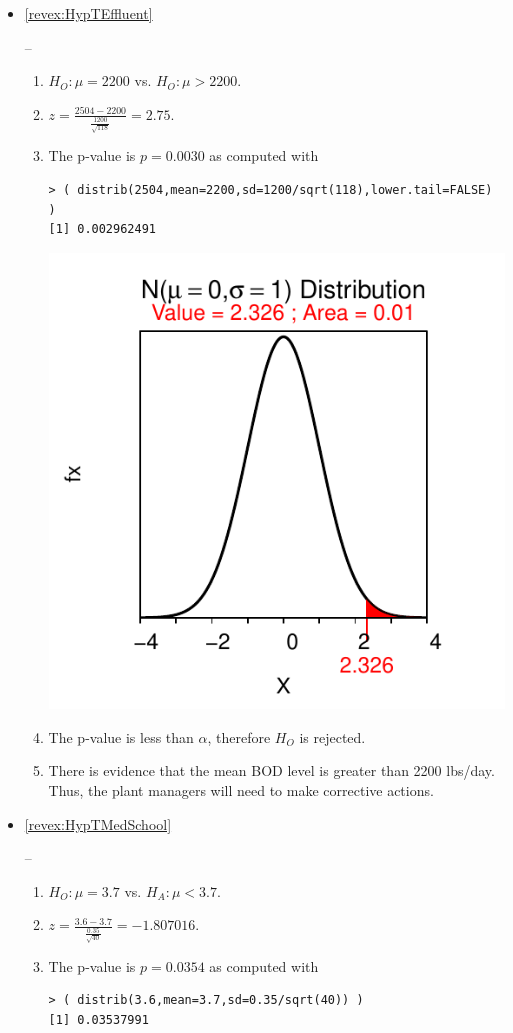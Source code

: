 \documentclass[10pt,openany]{book}\usepackage[]{graphicx}\usepackage[]{color}
\makeatletter
\newenvironment{kframe}{%
 \def\at@end@of@kframe{}%
 \ifinner\ifhmode%
  \def\at@end@of@kframe{\end{minipage}}%
  \begin{minipage}{\columnwidth}%
 \fi\fi%
 \def\FrameCommand##1{\hskip\@totalleftmargin \hskip-\fboxsep
 \colorbox{shadecolor}{##1}\hskip-\fboxsep
     \hskip-\linewidth \hskip-\@totalleftmargin \hskip\columnwidth}%
 \MakeFramed {\advance\hsize-\width
   \@totalleftmargin\z@ \linewidth\hsize
   \@setminipage}}%
 {\par\unskip\endMakeFramed%
 \at@end@of@kframe}
\newenvironment{knitrout}{}{} %
\makeatother
\begin{document}
\begin{itemize}
  \item \hypertarget{ans:HypTEffluent}{\ref{revex:HypTEffluent}} --
    \begin{enumerate}
      \item $H_{O}:\mu=2200$ vs. $H_{O}:\mu>2200$.
      \item $z=\frac{2504-2200}{\frac{1200}{\sqrt{118}}}=2.75$.
      \item The p-value is $p=0.0030$ as computed with
\begin{knitrout}
\color{fgcolor}\begin{kframe}
\begin{verbatim}
> ( distrib(2504,mean=2200,sd=1200/sqrt(118),lower.tail=FALSE) )
[1] 0.002962491
\end{verbatim}
\end{kframe}

{\centering \includegraphics[width=.4\linewidth]{Figs/unnamed-chunk-330-1} 

}



\end{knitrout}
      \item The p-value is less than $\alpha$, therefore $H_{O}$ is rejected.
      \item There is evidence that the mean BOD level is greater than 2200 lbs/day.  Thus, the plant managers will need to make corrective actions.
    \end{enumerate}

  \item \hypertarget{ans:HypTMedSchool}{\ref{revex:HypTMedSchool}} --
    \begin{enumerate}
      \item $H_{O}:\mu=3.7$ vs. $H_{A}:\mu<3.7$.
      \item $z=\frac{3.6-3.7}{\frac{0.35}{\sqrt{40}}}=-1.807016$.
      \item The p-value is $p=0.0354$ as computed with
\begin{knitrout}
\color{fgcolor}\begin{kframe}
\begin{verbatim}
> ( distrib(3.6,mean=3.7,sd=0.35/sqrt(40)) )
[1] 0.03537991
\end{verbatim}
\end{kframe}


\end{knitrout}
\end{enumerate}
\end{itemize}
\end{document}
